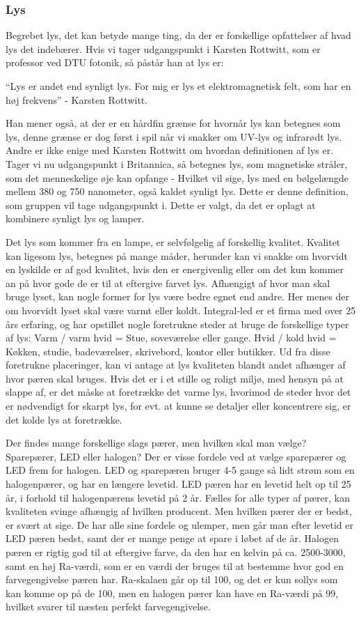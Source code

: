 \subsubsection{Lys}
Begrebet lys, det kan betyde mange ting, da der er forskellige opfattelser af hvad lys det indebærer. Hvis vi tager udgangspunkt i Karsten Rottwitt, som er professor ved DTU fotonik, så påstår han at lys er:

“Lys er andet end synligt lys. For mig er lys et elektromagnetisk felt, som har en høj frekvens”
- Karsten Rottwitt.

Han mener også, at der er en hårdfin grænse for hvornår lys kan betegnes som lys, denne grænse er dog først i spil når vi snakker om UV-lys og infrarødt lys. 
Andre er ikke enige med Karsten Rottwitt om hvordan definitionen af lys er. Tager vi nu udgangspunkt i Britannica, så betegnes lys, som magnetiske stråler, som det menneskelige øje kan opfange - Hvilket vil sige, lys med en bølgelængde mellem 380 og 750 nanometer, også kaldet synligt lys. 
Dette er denne definition, som gruppen vil tage udgangspunkt i. Dette er valgt, da det er oplagt at kombinere synligt lys og lamper.


Det lys som kommer fra en lampe, er selvfølgelig af forskellig kvalitet. Kvalitet kan ligesom lys, betegnes på mange måder, herunder kan vi snakke om hvorvidt en lyskilde er af god kvalitet, hvis den er energivenlig eller om det kun kommer an på hvor gode de er til at eftergive farvet lys. 
Afhængigt af hvor man skal bruge lyset, kan nogle former for lys være bedre egnet end andre. Her menes der om hvorvidt lyset skal være varmt eller koldt. Integral-led er et firma med over 25 års erfaring, og har opstillet nogle foretrukne steder at bruge de forskellige typer af lys:
Varm / varm hvid = Stue, soveværelse eller gange.
Hvid / kold hvid = Køkken, studie, badeværelser, skrivebord, kontor eller butikker. 
Ud fra disse foretrukne placeringer, kan vi antage at lys kvaliteten blandt andet afhænger af hvor pæren skal bruges. Hvis det er i et stille og roligt miljø, med hensyn på at slappe af, er det måske at foretrække det varme lys, hvorimod de steder hvor det er nødvendigt for skarpt lys, for evt. at kunne se detaljer eller koncentrere sig, er det kolde lys at foretrække.

Der findes mange forskellige slags pærer, men hvilken skal man vælge? Sparepærer, LED eller halogen?
Der er visse fordele ved at vælge sparepærer og LED frem for halogen. LED og sparepæren bruger 4-5 gange så lidt strøm som en halogenpærer, og har en længere levetid. LED pæren har en levetid helt op til 25 år, i forhold til halogenpærens levetid på 2 år.
Fælles for alle typer af pærer, kan kvaliteten svinge afhængig af hvilken producent. Men hvilken pærer der er bedst, er svært at sige. De har alle sine fordele og ulemper, men går man efter levetid er LED pæren bedst, samt der er mange penge at spare i løbet af de år. Halogen pæren er rigtig god til at eftergive farve, da den har en kelvin på ca. 2500-3000, samt en høj Ra-værdi, som er en værdi der bruges til at bestemme hvor god en farvegengivelse pæren har. 
Ra-skalaen går op til 100, og det er kun sollys som kan komme op på de 100, men en halogen pærer kan have en Ra-værdi på 99, hvilket svarer til næsten perfekt farvegengivelse. 

